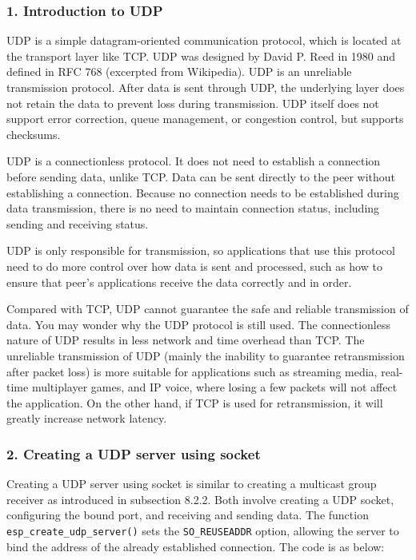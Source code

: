 \documentclass[a4paper,12pt]{book}
\begin{document}
\subsubsection{1. Introduction to UDP}
UDP is a simple datagram-oriented communication protocol, which is located at the transport layer like TCP. UDP was designed by David P. Reed in 1980 and defined in RFC 768 (excerpted from Wikipedia). UDP is an unreliable transmission protocol. After data is sent through UDP, the underlying layer does not retain the data to prevent loss during transmission. UDP itself does not support error correction, queue management, or congestion control, but supports checksums.

UDP is a connectionless protocol. It does not need to establish a connection before sending data, unlike TCP. Data can be sent directly to the peer without establishing a connection. Because no connection needs to be established during data transmission, there is no need to maintain connection status, including sending and receiving status.

UDP is only responsible for transmission, so applications that use this protocol need to do more control over how data is sent and processed, such as how to ensure that peer’s applications receive the data correctly and in order.

Compared with TCP, UDP cannot guarantee the safe and reliable transmission of data. You may wonder why the UDP protocol is still used. The connectionless nature of UDP results in less network and time overhead than TCP. The unreliable transmission of UDP (mainly the inability to guarantee retransmission after packet loss) is more suitable for applications such as streaming media, real-time multiplayer games, and IP voice, where losing a few packets will not affect the application. On the other hand, if TCP is used for retransmission, it will greatly increase network latency.

\subsubsection{2. Creating a UDP server using socket}

Creating a UDP server using socket is similar to creating a multicast group receiver as introduced in subsection 8.2.2. Both involve creating a UDP socket, configuring the bound port, and receiving and sending data. The function \verb|esp_create_udp_server()| sets the \verb|SO_REUSEADDR| option, allowing the server to bind the address of the already established connection. The code is as below:
\end{document}
